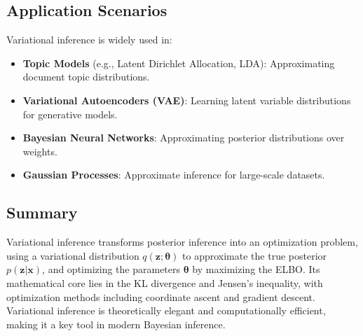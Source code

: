 \documentclass[10pt]{elegantbook}
\begin{document}
\subsection{Application Scenarios}

Variational inference is widely used in:
\begin{itemize}
    \item \textbf{Topic Models} (e.g., Latent Dirichlet Allocation, LDA): Approximating document topic distributions.
    \item \textbf{Variational Autoencoders (VAE)}: Learning latent variable distributions for generative models.
    \item \textbf{Bayesian Neural Networks}: Approximating posterior distributions over weights.
    \item \textbf{Gaussian Processes}: Approximate inference for large-scale datasets.
\end{itemize}

\subsection{Summary}

Variational inference transforms posterior inference into an optimization problem, using a variational distribution \( q(\mathbf{z}; \boldsymbol{\theta}) \) to approximate the true posterior \( p(\mathbf{z} | \mathbf{x}) \), and optimizing the parameters \( \boldsymbol{\theta} \) 
by maximizing the ELBO. Its mathematical core lies in the KL divergence and Jensen's inequality, with optimization methods including coordinate ascent and gradient descent. Variational inference is theoretically elegant and computationally efficient, making it a key tool in modern Bayesian inference.
\end{document}
